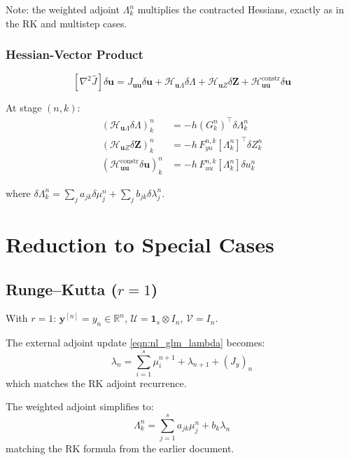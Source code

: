 \documentclass[11pt]{article}
\newcommand{\RR}{\mathbb{R}}
\newcommand{\tp}{^\top}
\newcommand{\Zv}{\mathbf{Z}}
\newcommand{\yv}{\mathbf{y}}
\newcommand{\uv}{\mathbf{u}}
\newcommand{\Uv}{\mathcal{U}}
\newcommand{\Vv}{\mathcal{V}}
\begin{document}
Note: the weighted adjoint $\Lambda_k^n$ multiplies the contracted Hessians, exactly as in the RK and multistep cases.

\subsubsection{Hessian-Vector Product}

\begin{equation}
\boxed{[\nabla^2\hat{J}]\delta\uv = J_{\uv\uv}\delta\uv + \mathcal{H}_{\uv\Lambda}\delta\Lambda + \mathcal{H}_{\uv Z}\delta\Zv + \mathcal{H}_{\uv\uv}^{\text{constr}}\delta\uv}
\end{equation}

At stage $(n,k)$:
\begin{align}
(\mathcal{H}_{\uv\Lambda}\delta\Lambda)_k^n &= -h(G_k^n)\tp \delta\Lambda_k^n \\
(\mathcal{H}_{\uv Z}\delta\Zv)_k^n &= -h\, F_{yu}^{n,k}[\Lambda_k^n]\tp \delta Z_k^n \\
(\mathcal{H}_{\uv\uv}^{\text{constr}}\delta\uv)_k^n &= -h\, F_{uu}^{n,k}[\Lambda_k^n] \delta u_k^n
\end{align}

where $\delta\Lambda_k^n = \sum_j a_{jk}\delta\mu_j^n + \sum_j b_{jk}\delta\lambda_j^n$.

\section{Reduction to Special Cases}

\subsection{Runge--Kutta ($r = 1$)}

With $r = 1$: $\yv^{[n]} = y_n \in \RR^n$, $\Uv = \mathbf{1}_s \otimes I_n$, $\Vv = I_n$.

The external adjoint update \eqref{eqn:nl_glm_lambda} becomes:
\begin{equation}
\lambda_n = \sum_{i=1}^s \mu_i^{n+1} + \lambda_{n+1} + (J_y)_n
\end{equation}
which matches the RK adjoint recurrence.

The weighted adjoint simplifies to:
\begin{equation}
\Lambda_k^n = \sum_{j=1}^s a_{jk}\mu_j^n + b_k \lambda_n
\end{equation}
matching the RK formula from the earlier document.
\end{document}
